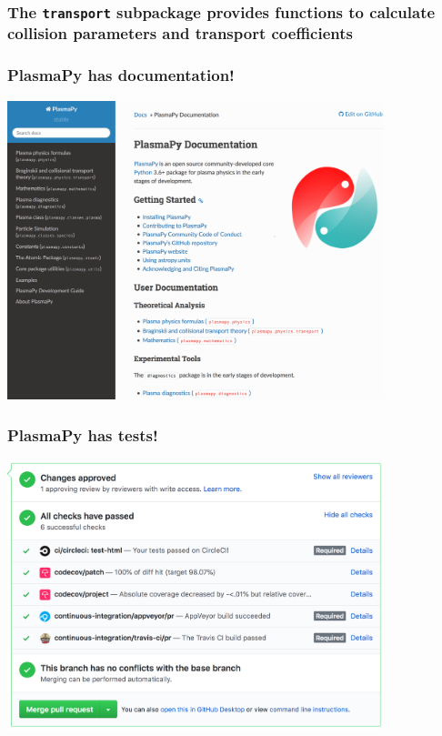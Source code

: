 \documentclass[default,compress]{beamer}
\begin{document}
\begin{frame}[plain]
    \frametitle{The \texttt{transport} subpackage provides functions to calculate collision parameters and transport coefficients}
    \classicaltransport
\end{frame}


\begin{frame}[plain]
    \frametitle{PlasmaPy has documentation!}
    \vspace{-1mm}
    \begin{center}
        \includegraphics[height=8.7cm]{PlasmaPy_docs.png}
    \end{center}
\end{frame}


\begin{frame}[plain]
    \frametitle{PlasmaPy has tests!}
    \begin{center}
        \includegraphics[height=7.8cm]{PlasmaPy_testsuite.png}
    \end{center}
\end{frame}
\end{document}
